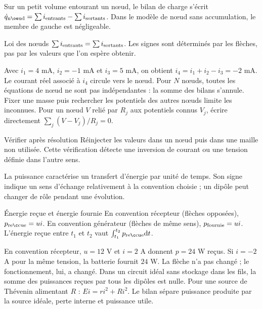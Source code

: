 Sur un petit volume entourant un nœud, le bilan de charge s’écrit $\dot q_{\rm nœud}=\sum i_{\rm entrants}-\sum i_{\rm sortants}$. Dans le modèle de nœud sans accumulation, le membre de gauche est négligeable.
\begin{loi}{Loi des nœuds}
$\sum i_{\rm entrants}=\sum i_{\rm sortants}$. Les signes sont déterminés par les flèches, pas par les valeurs que l’on espère obtenir.
\end{loi}
Avec $i_1=4$ mA, $i_2=-1$ mA et $i_3=5$ mA, on obtient $i_4=i_1+i_2-i_3=-2$ mA. Le courant réel associé à $i_4$ circule vers le nœud.
Pour $N$ nœuds, toutes les équations de nœud ne sont pas indépendantes : la somme des bilans s’annule. Fixer une masse puis rechercher les potentiels des autres nœuds limite les inconnues. Pour un nœud $V$ relié par $R_j$ aux potentiels connus $V_j$, écrire directement $\sum_j(V-V_j)/R_j=0$.
\begin{methode}{Vérifier après résolution}
Réinjecter les valeurs dans un nœud puis dans une maille non utilisée. Cette vérification détecte une inversion de courant ou une tension définie dans l’autre sens.
\end{methode}


La puissance caractérise un transfert d’énergie par unité de temps. Son signe indique un sens d’échange relativement à la convention choisie ; un dipôle peut changer de rôle pendant une évolution.
\begin{loi}{Énergie reçue et énergie fournie}
En convention récepteur (flèches opposées), $p_{\rm reçue}=ui$. En convention générateur (flèches de même sens), $p_{\rm fournie}=ui$. L’énergie reçue entre $t_1$ et $t_2$ vaut $\int_{t_1}^{t_2}p_{\rm reçue}\dd t$.
\end{loi}
En convention récepteur, $u=12$ V et $i=2$ A donnent $p=24$ W reçus. Si $i=-2$ A pour la même tension, la batterie fournit $24$ W. La flèche n’a pas changé ; le fonctionnement, lui, a changé.
Dans un circuit idéal sans stockage dans les fils, la somme des puissances reçues par tous les dipôles est nulle. Pour une source de Thévenin alimentant $R$ : $Ei=ri^2+Ri^2$. Le bilan sépare puissance produite par la source idéale, perte interne et puissance utile.


